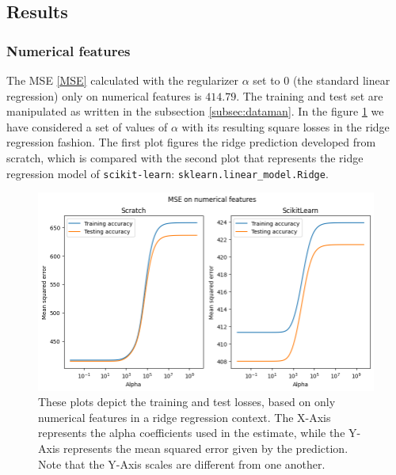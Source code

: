 \documentclass{article}
\begin{document}
\subsection{Results}
\subsubsection{Numerical features}
The MSE \eqref{MSE} calculated with the regularizer $\alpha$ set to $0$ (the standard linear regression) only on numerical features is $414.79$. The training and test set are manipulated as written in the subsection \ref{subsec:dataman}. In the figure \ref{rrmsenun} we have considered a set of values of $\alpha$ with its resulting square losses in the ridge regression fashion. The first plot figures the ridge prediction developed from scratch, which is compared with the second plot that represents the ridge regression model of \texttt{scikit-learn}: \texttt{sklearn.linear\_model.Ridge}. 

    
\begin{figure}[H]
	\begin{adjustwidth}{0 cm}{}
		\begin{center}
			\includegraphics[scale= 0.6]{images/MSE_numerical_vs.png}
		\end{center}
	\end{adjustwidth}
	\caption{These plots depict the training and test losses, based on only numerical features in a ridge regression context. The X-Axis represents the alpha coefficients used in the estimate, while the Y-Axis represents the mean squared error given by the prediction. Note that the Y-Axis scales are different from one another.}
	\label{rrmsenun}
\end{figure}
    
\end{document}
